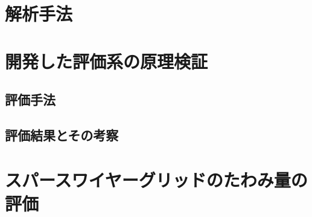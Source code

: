 \documentclass[../../main.tex]{subfiles}
\begin{document}
\section{解析手法}

\section{開発した評価系の原理検証}
\subsection{評価手法}
\subsection{評価結果とその考察}

\section{スパースワイヤーグリッドのたわみ量の評価}
\end{document}
